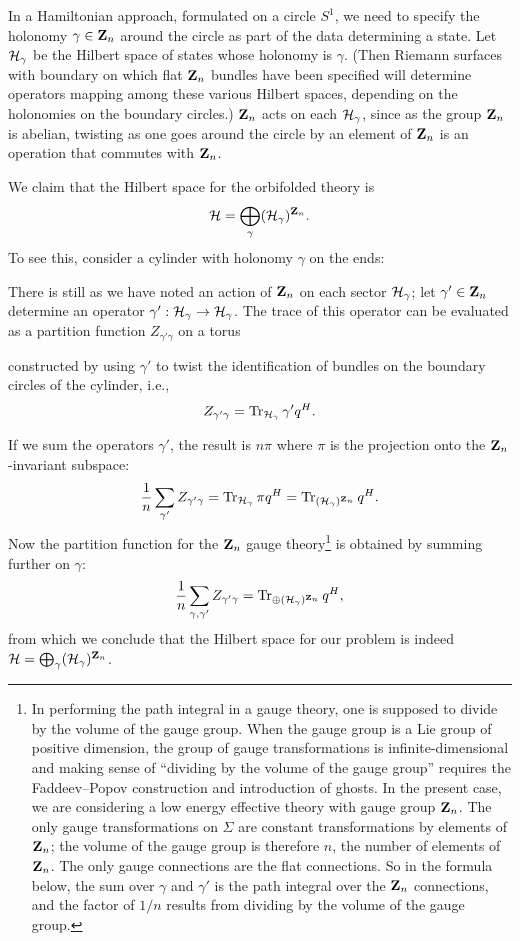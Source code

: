 In a Hamiltonian approach, formulated on a circle $S^1$, we need to
specify the holonomy $\gamma\in {\bf Z}_n$ around the circle as part of the
data
determining a state.  Let ${\cal H}_\gamma$ be the Hilbert space of states
whose holonomy is $\gamma$.  (Then Riemann surfaces with boundary
 on which flat ${\bf Z}_n$ bundles have been
specified will determine operators mapping among these various Hilbert spaces,
depending on the holonomies on the boundary circles.)
${\bf Z}_n$ acts on each ${\cal H}_\gamma$, since as the group ${\bf Z}_n$
is abelian, twisting as one goes around the circle by an element of
${\bf Z}_n$ is an operation that commutes with ${\bf Z}_n$.

We claim that the Hilbert space for the orbifolded theory is
$${\cal H}=\bigoplus_\gamma({\cal H}_\gamma)^{{\bf Z}_n}.$$
To see this, consider a cylinder with holonomy $\gamma$ on the ends:

\centerline{\quad}
\centerline{\epsfxsize=1.35in}
\centerline{\quad}

There is still as we have noted
an action of ${\bf Z}_n$ on each sector ${\cal H}_\gamma$;
let $\gamma'\in{\bf Z}_n$ determine an operator $\gamma':{\cal
H}_\gamma\to{\cal H}_\gamma$.
The trace of this operator can be evaluated as a partition function
$Z_{\gamma'\gamma}$
on a torus

\centerline{\quad}
\centerline{\epsfxsize=1.25in}
\centerline{\quad}

\noindent
constructed by using $\gamma'$ to twist the identification of bundles on
the boundary circles of the cylinder, i.e.,
$$Z_{\gamma'\gamma}=\mathop{\rm Tr}\nolimits_{{\cal H}_\gamma}\gamma'q^H .$$



If we  sum the operators $\gamma'$, the result is $n\pi$ where
$\pi$ is the projection onto the  ${\bf Z}_n$-invariant subspace:
$$\frac1n\sum_{\gamma'}Z_{\gamma'\gamma}=\mathop{\rm Tr}\nolimits_{{\cal H}_\gamma}\pi
q^H=\mathop{\rm Tr}\nolimits_{({\cal H}_\gamma)^{{\bf Z}_n}}q^H.$$
Now the partition function for the ${\bf Z}_n$ gauge theory\footnote{
In performing the path integral in a gauge theory, one is supposed
to divide by the volume of the gauge group.  When the gauge group
is a Lie group of positive dimension, the group of gauge transformations
is infinite-dimensional and making sense of ``dividing by the volume
of the gauge group'' requires the Faddeev--Popov construction and
introduction of ghosts.  In the present case, we are considering
a low energy effective theory with  gauge group ${\bf Z}_n$.  The only
gauge transformations on $\Sigma$ are constant transformations by elements
of ${\bf Z}_n$; the volume of the gauge group is therefore $n$, the number
of elements of ${\bf Z}_n$.   The only
gauge connections are the flat connections.  So in the formula below,
the sum over $\gamma$ and $\gamma'$ is the path integral over the ${\bf Z}_n$
connections, and the factor of $1/n$ results from dividing by the
volume of the gauge group.} is obtained by summing further
on $\gamma$:
$$\frac1n\sum_{\gamma,\gamma'}Z_{\gamma'\gamma}=\mathop{\rm Tr}\nolimits_{\oplus ({\cal
H}_\gamma)^{{\bf Z}_n}}q^H,$$
from which we conclude that the Hilbert space for our problem is indeed
${\cal H}=\bigoplus_\gamma ({\cal H}_\gamma)^{{\bf Z}_n}$.


